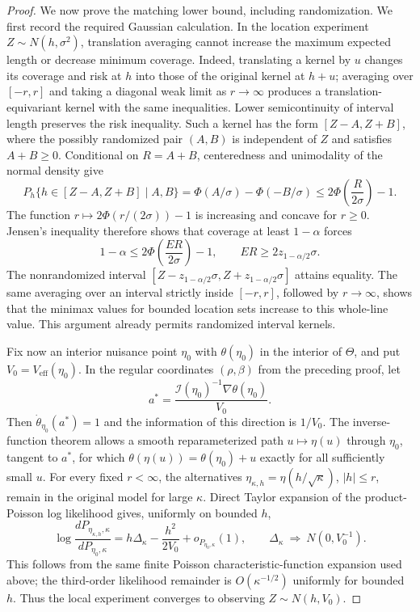 \documentclass{article}
\begin{document}
\begin{proof}
We now prove the matching lower bound, including randomization.  We first
record the required Gaussian calculation.  In the location experiment
\(Z\sim N(h,\sigma^2)\), translation averaging cannot increase the maximum
expected length or decrease minimum coverage.  Indeed, translating a
kernel by \(u\) changes its coverage and risk at \(h\) into those of the
original kernel at \(h+u\); averaging over \([-r,r]\) and taking a diagonal
weak limit as \(r\to\infty\) produces a translation-equivariant kernel with
the same inequalities.  Lower semicontinuity of interval length preserves
the risk inequality.  Such a kernel has the form
\([Z-A,Z+B]\), where the possibly randomized pair \((A,B)\) is independent
of \(Z\) and satisfies \(A+B\geq0\).  Conditional on
\(R=A+B\), centeredness and unimodality of the normal density give
\[
 P_h\{h\in[Z-A,Z+B]\mid A,B\}
 =\Phi(A/\sigma)-\Phi(-B/\sigma)
 \leq 2\Phi\left(\frac{R}{2\sigma}\right)-1.
\]
The function \(r\mapsto2\Phi(r/(2\sigma))-1\) is increasing and concave
for \(r\geq0\).  Jensen's inequality therefore shows that coverage at
least \(1-\alpha\) forces
\[
 1-\alpha
 \leq2\Phi\left(\frac{E R}{2\sigma}\right)-1,
 \qquad
 E R\geq2z_{1-\alpha/2}\sigma.
\]
The nonrandomized interval
\([Z-z_{1-\alpha/2}\sigma,Z+z_{1-\alpha/2}\sigma]\) attains equality.
The same averaging over an interval strictly inside \([-r,r]\), followed
by \(r\to\infty\), shows that the minimax values for bounded location
sets increase to this whole-line value.  This argument already permits
randomized interval kernels.

Fix now an interior nuisance point \(\eta_0\) with
\(\theta(\eta_0)\) in the interior of \(\Theta\), and put
\(V_0=V_{\mathrm{eff}}(\eta_0)\).  In the regular coordinates
\((\rho,\beta)\) from the preceding proof, let
\[
 a^*=\frac{\mathcal I(\eta_0)^{-1}\nabla\theta(\eta_0)}{V_0}.
\]
Then \(\dot\theta_{\eta_0}(a^*)=1\) and the information of this direction
is \(1/V_0\).  The inverse-function theorem allows a smooth reparameterized
path \(u\mapsto\eta(u)\) through \(\eta_0\), tangent to \(a^*\), for which
\(\theta(\eta(u))=\theta(\eta_0)+u\) exactly for all sufficiently small
\(u\).  For every fixed \(r<\infty\), the alternatives
\(\eta_{\kappa,h}=\eta(h/\sqrt\kappa)\), \(|h|\leq r\), remain in the
original model for large \(\kappa\).  Direct Taylor expansion of the
product-Poisson log likelihood gives, uniformly on bounded \(h\),
\[
 \log\frac{dP_{\eta_{\kappa,h},\kappa}}
              {dP_{\eta_0,\kappa}}
 =h\Delta_\kappa-\frac{h^2}{2V_0}+o_{P_{\eta_0,\kappa}}(1),
 \qquad
 \Delta_\kappa\ \Longrightarrow\ N(0,V_0^{-1}).
\]
This follows from the same finite Poisson characteristic-function expansion
used above; the third-order likelihood remainder is
\(O(\kappa^{-1/2})\) uniformly for bounded \(h\).  Thus the local
experiment converges to observing \(Z\sim N(h,V_0)\).


\end{proof}
\end{document}
